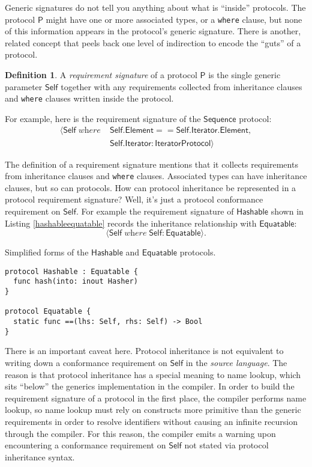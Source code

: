 \documentclass[headsepline,bibliography=totoc]{scrreport}
\newcommand{\namesym}[1]{\mathsf{#1}}
\newcommand{\genericparam}[1]{\bm{\mathsf{#1}}}
\newcommand{\proto}[1]{\bm{\mathsf{#1}}}
\newcommand{\gensig}[2]{\langle #1\;\textit{where}\;#2\rangle}
\theoremstyle{definition}
\theoremstyle{definition}
\newtheorem{definition}{Definition}[chapter]
\theoremstyle{definition}
\begin{document}
Generic signatures do not tell you anything about what is ``inside'' protocols. The protocol $\proto{P}$ might have one or more associated types, or a \texttt{where} clause, but none of this information appears in the protocol's generic signature. There is another, related concept that peels back one level of indirection to encode the ``guts'' of a protocol.

\begin{definition} A \emph{requirement signature} of a protocol $\proto{P}$ is the single generic parameter $\genericparam{Self}$ together with any requirements collected from inheritance clauses and \texttt{where} clauses written inside the protocol.
\end{definition}

For example, here is the requirement signature of the $\proto{Sequence}$ protocol:
\begin{align*}
\gensig{\genericparam{Self}}{&\genericparam{Self}.\namesym{Element}==\genericparam{Self}.\namesym{Iterator}.\namesym{Element},\\
&\genericparam{Self}.\namesym{Iterator}\colon\proto{IteratorProtocol}}
\end{align*}

The definition of a requirement signature mentions that it collects requirements from inheritance clauses and \texttt{where} clauses. Associated types can have inheritance clauses, but so can protocols. How can protocol inheritance be represented in a protocol requirement signature? Well, it's just a protocol conformance requirement on $\genericparam{Self}$. For example the requirement signature of $\proto{Hashable}$ shown in Listing \ref{hashableequatable} records the inheritance relationship with $\proto{Equatable}$:
\[\gensig{\genericparam{Self}}{\genericparam{Self}\colon\proto{Equatable}}.\]
\begin{listing}\caption{Simplified forms of the $\proto{Hashable}$ and $\proto{Equatable}$ protocols.}\label{hashableequatable}
\begin{Verbatim}
protocol Hashable : Equatable {
  func hash(into: inout Hasher)
}

protocol Equatable {
  static func ==(lhs: Self, rhs: Self) -> Bool
}
\end{Verbatim}
\end{listing}

There is an important caveat here. Protocol inheritance is not equivalent to writing down a conformance requirement on $\genericparam{Self}$ in the \emph{source language}. The reason is that protocol inheritance has a special meaning to name lookup, which sits ``below'' the generics implementation in the compiler. In order to build the requirement signature of a protocol in the first place, the compiler performs name lookup, so name lookup must rely on constructs more primitive than the generic requirements in order to resolve identifiers without causing an infinite recursion through the compiler. For this reason, the compiler emits a warning upon encountering a conformance requirement on $\genericparam{Self}$ not stated via protocol inheritance syntax.
\vfill
\eject
\end{document}
